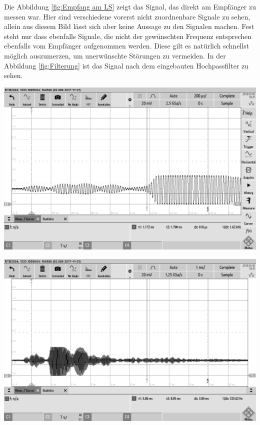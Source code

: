 Die Abbildung \ref{fig:Empfang am LS} zeigt das Signal, das direkt am Empfänger zu messen war. Hier sind verschiedene vorerst nicht zuordnenbare Signale zu sehen, allein aus diesem Bild lässt sich aber keine Aussage zu den Signalen machen. Fest steht nur dass ebenfalls Signale, die nicht der gewünschten Frequenz entsprechen ebenfalls vom Empfänger aufgenommen werden. Diese gilt es natürlich schnellst möglich auszumerzen, um unerwünschte Störungen zu vermeiden.
In der Abbildung \ref{fig:Filterung} ist das Signal nach dem eingebauten Hochpassfilter zu sehen.\\
\begin{minipage}{0.5\textwidth}
\includegraphics[width=1\textwidth, draft]{Abbildungen/Signal-nach-Verstarkung.png}
\label{fig:Verstaerkung}
\end{minipage}
\begin{minipage}{0.5\textwidth}
\includegraphics[width=1\textwidth, draft]{Abbildungen/Signal-nach-Verstarkung2.png}
\label{fig:Verstaerkung2}
\end{minipage}
